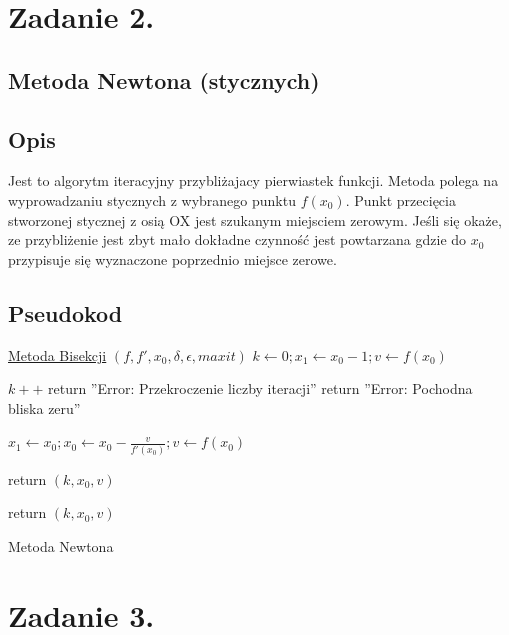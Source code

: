 \documentclass[11pt, a4paper]{article}
\begin{document}
    \section{Zadanie 2.}
    \subsection{Metoda Newtona (stycznych)}
    \subsection{Opis}
    Jest to algorytm iteracyjny przybliżajacy pierwiastek funkcji. Metoda polega na wyprowadzaniu stycznych z wybranego punktu $f(x_{0})$. Punkt przecięcia stworzonej stycznej z osią OX jest szukanym miejsciem zerowym. Jeśli się okaże, ze przybliżenie jest zbyt mało dokładne czynność jest powtarzana gdzie do $x_{0}$ przypisuje się wyznaczone poprzednio miejsce zerowe. 
    \subsection{Pseudokod}
    \begin{algorithm}[H]

        \underline{Metoda Bisekcji} $(f, f',x_{0}, \delta,\epsilon, maxit)$\;
        $k \leftarrow 0; x_{1} \leftarrow x_{0} - 1; v \leftarrow f(x_{0})$\;
        {
            $k++$\;
            {
                return ''Error: Przekroczenie liczby iteracji''\;
            }
            {
                return ''Error: Pochodna bliska zeru''\;
            }

            $x_{1} \leftarrow x_{0}; x_{0} \leftarrow x_{0} - \frac{v}{f'(x_{0})}; v \leftarrow f(x_{0})$\;

            {
                return $(k, x_{0}, v)$\;
            }
        }
        return $(k, x_{0}, v)$\;
        \caption{Metoda Newtona}
    \end{algorithm}
    \section{Zadanie 3.}
\end{document}
